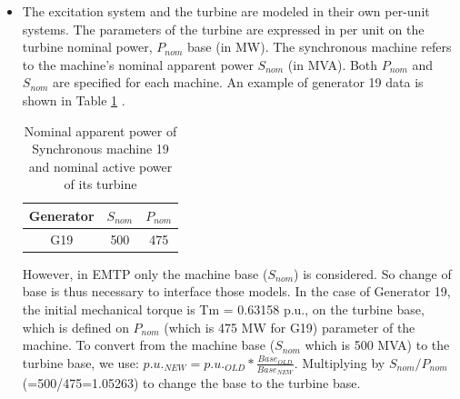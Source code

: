 \documentclass{report}
\begin{document}
\begin{itemize}
For modeling saturation, it is essential to know the field current value in amperes that produces a 1 pu armature voltage, without considering saturation ("on the air gap line"). However, this information is not available in the phasor model and data (in STEPSS), as the entire phasor model is in per unit. It is assumed that the correct field current base has been used in the field winding to derive the per-unit values of the machine parameters, but this base value is unknown. Therefore, we cannot retrieve the field current values in amperes from the document \cite{van2015test}. Nonetheless, values per unit are sufficient because the machine's behavior should not depend on the base value.

Since providing a field current value is mandatory in EMTP, we use a plausible dummy value, such as 1000 A (1 kA) for the 500-MVA machine g19. A detailed comparison is then presented between cases with and without saturation. The saturation in the synchronous machine in the EMTP model follows a piecewise linear characteristic. The slope of each segment shall decrease with the increase of voltage. To have a good match with STEPSS we calculate V, and I points from the formula and EMTP will apply a piecewise linear approximation between these points as shown in Fig.\ref{fig:EMTPSat}
    
    \item The excitation system and the turbine are modeled in their own per-unit systems. The parameters of the turbine are expressed in per unit on the turbine nominal power, $P_{nom}$ base (in MW). The synchronous machine refers to the machine's nominal apparent power $S_{nom}$ (in MVA). Both $P_{nom}$ and  $S_{nom}$  are specified for each machine. An example of generator 19 data is shown in Table \ref{tab:G19} \cite{van2015test}.
\begin{table}[H]
\centering
\caption{Nominal apparent power of Synchronous machine 19 and nominal active power of its turbine}
\begin{tabular}{|c|c|c|}
    \hline
    Generator & $S_{nom}$ & $P_{nom}$ \\
    \hline
    G19 & 500 & 475 \\
    \hline
\end{tabular}
\label{tab:G19}
\end{table}
However, in EMTP only the machine base ($S_{nom}$) is considered. So change of base is thus necessary to interface those models. In the case of Generator 19, the initial mechanical torque is Tm = 0.63158 p.u., on the turbine base, which is defined on $P_{nom}$ (which is 475 MW for G19) parameter of the machine. To convert from the machine base ($S_{nom}$ which is 500 MVA) to the turbine base, we use:
$p.u._{NEW}=p.u._{OLD}*\frac{Base_{OLD}}{Base_{NEW}}$.  
Multiplying by $S_{nom}/P_{nom}$ (=500/475=1.05263) to change the base to the turbine base. 
\end{itemize}
\end{document}
